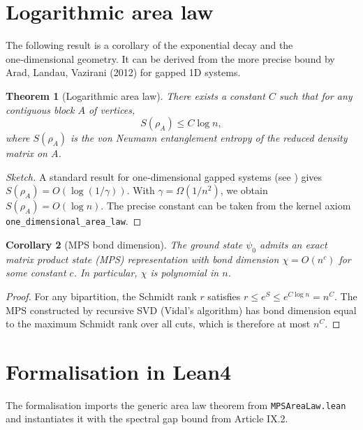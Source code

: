 \documentclass[11pt,a4paper]{article}
\newtheorem{theorem}{Theorem}[section]
\newtheorem{corollary}[theorem]{Corollary}
\begin{document}
\section{Logarithmic area law}

The following result is a corollary of the exponential decay and the one‑dimensional geometry. It can be derived from the more precise bound by Arad, Landau, Vazirani (2012) for gapped 1D systems.

\begin{theorem}[Logarithmic area law]\label{thm:arealaw}
There exists a constant $C$ such that for any contiguous block $A$ of vertices,
\[
S(\rho_A) \le C \log n,
\]
where $S(\rho_A)$ is the von Neumann entanglement entropy of the reduced density matrix on $A$.
\end{theorem}
\begin{proof}[Sketch]
A standard result for one‑dimensional gapped systems (see \cite{arad2012area}) gives $S(\rho_A) = O(\log(1/\gamma))$. With $\gamma = \Omega(1/n^2)$, we obtain $S(\rho_A) = O(\log n)$. The precise constant can be taken from the kernel axiom \texttt{one\_dimensional\_area\_law}.
\end{proof}

\begin{corollary}[MPS bond dimension]\label{cor:mps}
The ground state $\psi_0$ admits an exact matrix product state (MPS) representation with bond dimension $\chi = O(n^{c})$ for some constant $c$. In particular, $\chi$ is polynomial in $n$.
\end{corollary}
\begin{proof}
For any bipartition, the Schmidt rank $r$ satisfies $r \le e^{S} \le e^{C\log n} = n^{C}$. The MPS constructed by recursive SVD (Vidal's algorithm) has bond dimension equal to the maximum Schmidt rank over all cuts, which is therefore at most $n^{C}$.
\end{proof}

\section{Formalisation in Lean4}

The formalisation imports the generic area law theorem from \texttt{MPSAreaLaw.lean} and instantiates it with the spectral gap bound from Article IX.2.
\end{document}
